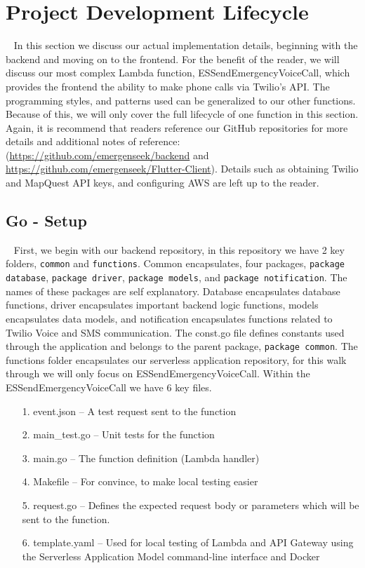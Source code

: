 \documentclass[10pt, a4paper]{article}
\begin{document}
\section{Project Development Lifecycle} 
\label{sec:pdl}
\par ~ In this section we discuss our actual implementation details, beginning with the backend and moving on to the frontend. For the benefit of the reader, we will discuss our most complex Lambda function, ESSendEmergencyVoiceCall, which provides the frontend the ability to make phone calls via Twilio's API. The programming styles, and patterns used can be generalized to our other functions. Because of this, we will only cover the full lifecycle of one function in this section. Again, it is recommend that readers reference our GitHub repositories for more details and additional notes of reference: (\url{https://github.com/emergenseek/backend} and \url{https://github.com/emergenseek/Flutter-Client}). Details such as obtaining Twilio and MapQuest API keys, and configuring AWS are left up to the reader. 

\subsection{Go - Setup}
\par ~ First, we begin with our backend repository, in this repository we have 2 key folders, \texttt{common} and \texttt{functions}. Common encapsulates, four packages, \texttt{package database}, \texttt{package driver}, \texttt{package models}, and \texttt{package notification}. The names of these packages are self explanatory. Database encapsulates database functions, driver encapsulates important backend logic functions, models encapsulates data models, and notification encapsulates functions related to Twilio Voice and SMS communication. The const.go file defines constants used through the application and belongs to the parent package, \texttt{package common}. The functions folder encapsulates our serverless application repository, for this walk through we will only focus on ESSendEmergencyVoiceCall. Within the ESSendEmergencyVoiceCall we have 6 key files. 
\begin{enumerate}
	\item[1.] event.json -- A test request sent to the function
	\item[2.] main\_test.go -- Unit tests for the function
	\item[3.] main.go -- The function definition (Lambda handler)
	\item[4.] Makefile -- For convince, to make local testing easier
	\item[5.] request.go -- Defines the expected request body or parameters which will be sent to the function. 
	\item[6.] template.yaml -- Used for local testing of Lambda and API Gateway using the Serverless Application Model command-line interface and Docker
\end{enumerate}
\end{document}

